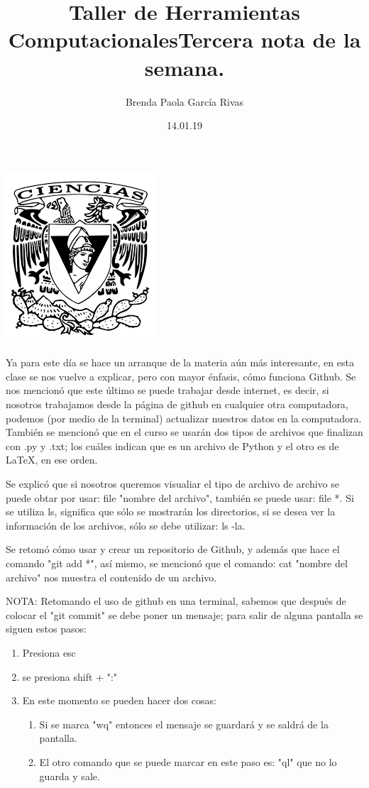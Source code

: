 \documentclass[letterpaper, 12pt, oneside]{article}
\title{\Huge\color{green} Taller de Herramientas Computacionales}
\author{Brenda Paola García Rivas}
\date{14.01.19}
\begin{document}
	\maketitle
	\begin{center}
		\includegraphics[scale=0.95]{1.png}
	\end{center}
	\newpage
	\title{\huge Tercera nota de la semana.\\}
	
	Ya para este día se hace un arranque de la materia aún más interesante, en esta clase se nos vuelve a explicar, pero con mayor énfasis, cómo funciona Github. Se nos mencionó que este último se puede trabajar desde internet, es decir, si nosotros trabajamos desde la página de github en cualquier otra computadora, podemos (por medio de la terminal) actualizar nuestros datos en la computadora.
	También se mencionó que en el curso se usarán dos tipos de archivos que finalizan con .py y .txt; los cuáles indican que es un archivo de Python y el otro es de LaTeX, en ese orden.
	
	Se explicó que si nosotros queremos visualiar el tipo de archivo de archivo se puede obtar por usar: file "nombre del archivo", también se puede usar: file *.
	Si se utiliza ls, significa que sólo se mostrarán los directorios, si se desea ver la información de los archivos, sólo se debe utilizar: ls -la.
	
	Se retomó cómo usar y crear un repositorio de Github, y además que hace el comando "git add *", así mismo, se mencionó que el comando: cat "nombre del archivo" nos muestra el contenido de un archivo.
	
	NOTA: Retomando el uso de github en una terminal, sabemos que después de colocar el "git commit" se debe poner un mensaje; para salir de alguna pantalla se siguen estos pasos:
	\begin{enumerate}
		\item 
		Presiona esc
		\item 
		se presiona shift + ":"
		\item 
		En este momento se pueden hacer dos cosas:
		\begin{enumerate}
			\item 
			Si se marca "wq" entonces el mensaje se guardará y se saldrá de la pantalla.
			\item 
			El otro comando que se puede marcar en este paso es: "ql" que no lo guarda y sale.
		\end{enumerate}
	\end{enumerate}
	
\end{document}
